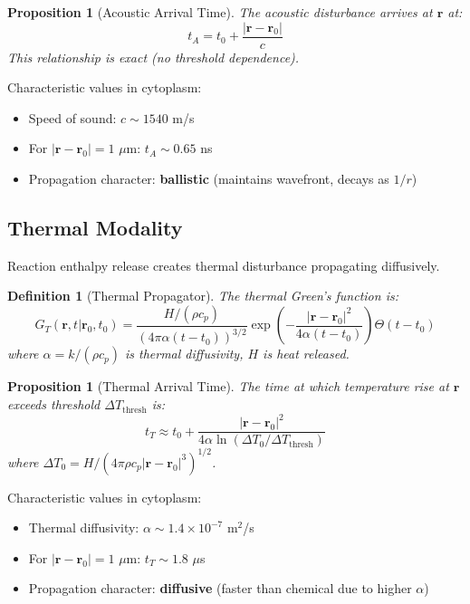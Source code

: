 \documentclass[11pt,a4paper]{article}
\newtheorem{definition}[theorem]{Definition}
\newtheorem{proposition}[theorem]{Proposition}
\theoremstyle{remark}
\newcommand{\rxnpos}{\mathbf{r}_0}
\newcommand{\rxntime}{t_0}
\newcommand{\obspos}{\mathbf{r}}
\begin{document}
\begin{proposition}[Acoustic Arrival Time]
\label{prop:acoustic_arrival}
The acoustic disturbance arrives at $\obspos$ at:
\begin{equation}
    t_A = \rxntime + \frac{|\obspos - \rxnpos|}{c}
\end{equation}
This relationship is exact (no threshold dependence).
\end{proposition}

Characteristic values in cytoplasm:
\begin{itemize}
    \item Speed of sound: $c \sim 1540$ m/s
    \item For $|\obspos - \rxnpos| = 1$ $\mu$m: $t_A \sim 0.65$ ns
    \item Propagation character: \textbf{ballistic} (maintains wavefront, decays as $1/r$)
\end{itemize}

\subsection{Thermal Modality}

Reaction enthalpy release creates thermal disturbance propagating diffusively.

\begin{definition}[Thermal Propagator]
The thermal Green's function is:
\begin{equation}
    G_T(\mathbf{r}, t | \rxnpos, \rxntime) = \frac{H/(\rho c_p)}{(4\pi \alpha (t-\rxntime))^{3/2}} \exp\left(-\frac{|\mathbf{r} - \rxnpos|^2}{4\alpha(t-\rxntime)}\right) \Theta(t - \rxntime)
\end{equation}
where $\alpha = k/(\rho c_p)$ is thermal diffusivity, $H$ is heat released.
\end{definition}

\begin{proposition}[Thermal Arrival Time]
\label{prop:thermal_arrival}
The time at which temperature rise at $\obspos$ exceeds threshold $\Delta T_{\text{thresh}}$ is:
\begin{equation}
    t_T \approx \rxntime + \frac{|\obspos - \rxnpos|^2}{4\alpha \ln(\Delta T_0/\Delta T_{\text{thresh}})}
\end{equation}
where $\Delta T_0 = H/(4\pi \rho c_p |\obspos - \rxnpos|^3)^{1/2}$.
\end{proposition}

Characteristic values in cytoplasm:
\begin{itemize}
    \item Thermal diffusivity: $\alpha \sim 1.4 \times 10^{-7}$ m$^2$/s
    \item For $|\obspos - \rxnpos| = 1$ $\mu$m: $t_T \sim 1.8$ $\mu$s
    \item Propagation character: \textbf{diffusive} (faster than chemical due to higher $\alpha$)
\end{itemize}
\end{document}
